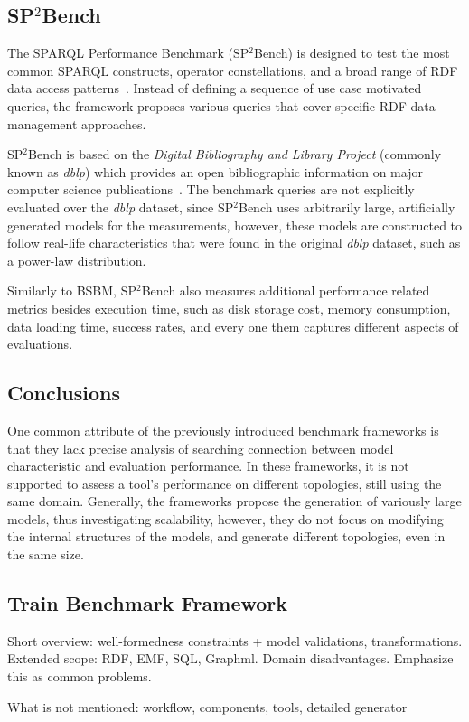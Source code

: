 \subsection{SP$^2$Bench}
The SPARQL Performance Benchmark (SP$^2$Bench) is designed to test the most common SPARQL constructs,
operator constellations, and a broad range of RDF data access patterns~\cite{sp2bench}. Instead of defining a sequence of use case motivated queries, the framework proposes various queries that cover specific RDF data management approaches.

SP$^2$Bench is based on the \textit{Digital Bibliography and Library Project} (commonly known as \textit{dblp}) which provides an open bibliographic information on major computer science publications~\cite{dblp}. The benchmark queries are not explicitly evaluated over the \textit{dblp} dataset, since SP$^2$Bench uses arbitrarily large, artificially generated models for the measurements, however, these models are constructed to follow real-life characteristics that were found in the original \textit{dblp} dataset, such as a power-law distribution.

Similarly to BSBM, SP$^2$Bench also measures additional performance related metrics besides execution time, such as disk storage cost, memory consumption, data loading time, success rates, and every one them captures different aspects of evaluations.


\subsection{Conclusions} \label{sec:benchmark_conclusions}

One common attribute of the previously introduced benchmark frameworks is that they lack precise analysis of searching connection between model characteristic and evaluation performance. In these frameworks, it is not supported to assess a tool's performance on different topologies, still using the same domain. Generally, the frameworks propose the generation of variously large models, thus investigating scalability, however, they do not focus on modifying the internal structures of the models, and generate different topologies, even in the same size.
 


\subsection{Train Benchmark Framework}
Short overview: well-formedness constraints + model validations, transformations.\\
Extended scope: RDF, EMF, SQL, Graphml.
Domain disadvantages. Emphasize this as common problems.

What is not mentioned: workflow, components, tools, detailed generator